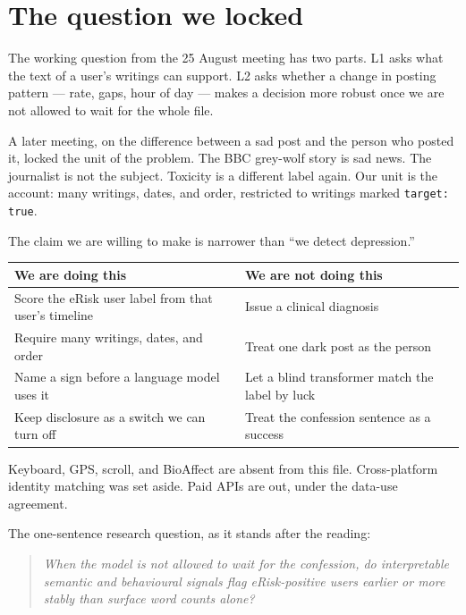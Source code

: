 \documentclass[11pt,a4paper]{article}
\begin{document}
\tableofcontents
\newpage

\section{The question we locked}
The working question from the 25 August meeting has two parts. L1 asks what the text of a user's writings can support. L2 asks whether a change in posting pattern --- rate, gaps, hour of day --- makes a decision more robust once we are not allowed to wait for the whole file.

A later meeting, on the difference between a sad post and the person who posted it, locked the unit of the problem. The BBC grey-wolf story is sad news. The journalist is not the subject. Toxicity is a different label again. Our unit is the account: many writings, dates, and order, restricted to writings marked \texttt{target: true}.

The claim we are willing to make is narrower than ``we detect depression.''

\begin{center}
\begin{tabular}{p{}p{}}
\toprule
\textbf{We are doing this} & \textbf{We are not doing this} \\
\midrule
Score the eRisk user label from that user's timeline & Issue a clinical diagnosis \\
Require many writings, dates, and order & Treat one dark post as the person \\
Name a sign before a language model uses it & Let a blind transformer match the label by luck \\
Keep disclosure as a switch we can turn off & Treat the confession sentence as a success \\
\bottomrule
\end{tabular}
\end{center}

Keyboard, GPS, scroll, and BioAffect are absent from this file. Cross-platform identity matching was set aside. Paid APIs are out, under the data-use agreement.

The one-sentence research question, as it stands after the reading:
\begin{quote}
\emph{When the model is not allowed to wait for the confession, do interpretable semantic and behavioural signals flag eRisk-positive users earlier or more stably than surface word counts alone?}
\end{quote}
\end{document}
